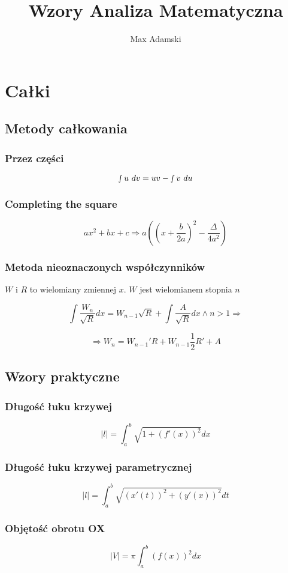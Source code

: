\documentclass[11pt]{article}
\title{Wzory Analiza Matematyczna}
\author{Max Adamski}
\date{}
\begin{document}
\section{Całki}

\subsection{Metody całkowania}

\subsubsection{Przez części}
$$\smallint u\ dv = uv - \smallint v\ du$$

\subsubsection{Completing the square}
$$
ax^2 + bx + c \Rightarrow
a\left(\left(x + \frac{b}{2a}\right)^2 - \frac{\Delta}{4a^2}\right)
$$

\subsubsection{Metoda nieoznaczonych współczynników}

$W$ i $R$ to wielomiany zmiennej $x$. $W$ jest wielomianem stopnia $n$

$$\int \frac{W_n}{\sqrt R} dx = W_{n-1} \sqrt R + \int \frac{A}{\sqrt R} dx \land n > 1 \Rightarrow$$

$$\Rightarrow W_n = W_{n-1}' R + W_{n-1} \frac{1}{2} R' + A$$


\subsection{Wzory praktyczne}

\subsubsection{Długość łuku krzywej}
$$|l| = \int_a^b \sqrt{1 + (f'(x))^2}dx$$

\subsubsection{Długość łuku krzywej parametrycznej}
$$|l| = \int_a^b \sqrt{(x'(t))^2 + (y'(x))^2}dt$$

\subsubsection{Objętość obrotu OX}
$$|V| = \pi \int_a^b (f(x))^2 dx$$
\end{document}
